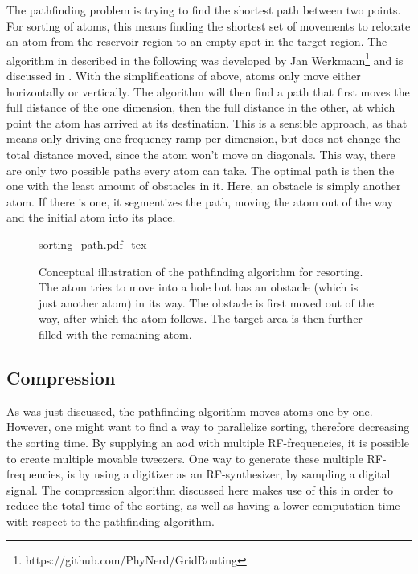 The pathfinding problem is trying to find the shortest path between two points. For sorting of atoms, this means finding the shortest set of movements to relocate an atom from the reservoir region to an empty spot in the target region.
The algorithm in described in the following was developed by Jan Werkmann\footnote{https://github.com/PhyNerd/GridRouting} and is discussed in \cite{OhldeMello2020}. With the simplifications of above, atoms only move either horizontally or vertically. The algorithm will then find a path that first moves the full distance of the one dimension, then the full distance in the other, at which point the atom has arrived at its destination. This is a sensible approach, as that means only driving one frequency ramp per dimension, but does not change the total distance moved, since the atom won't move on diagonals.
This way, there are only two possible paths every atom can take. The optimal path is then the one with the least amount of obstacles in it. Here, an obstacle is simply another atom. If there is one, it segmentizes the path, moving the atom out of the way and the initial atom into its place.

\begin{figure}[ht]
\label{fig:sorting_path}
\centering
	{sorting_path.pdf_tex}
	\caption{Conceptual illustration of the pathfinding algorithm for resorting. The atom tries to move into a hole but has an obstacle (which is just another atom) in its way. The obstacle is first moved out of the way, after which the atom follows. The target area is then further filled with the remaining atom.}
\end{figure}

\subsection{Compression}
\label{sec:compression}

As was just discussed, the pathfinding algorithm moves atoms one by one. However, one might want to find a way to parallelize sorting, therefore decreasing the sorting time. By supplying an \ac{aod} with multiple RF-frequencies, it is possible to create multiple movable tweezers. One way to generate these multiple RF-frequencies, is by using a digitizer as an RF-synthesizer, by sampling a digital signal. The compression algorithm discussed here makes use of this in order to reduce the total time of the sorting, as well as having a lower computation time with respect to the pathfinding algorithm.

